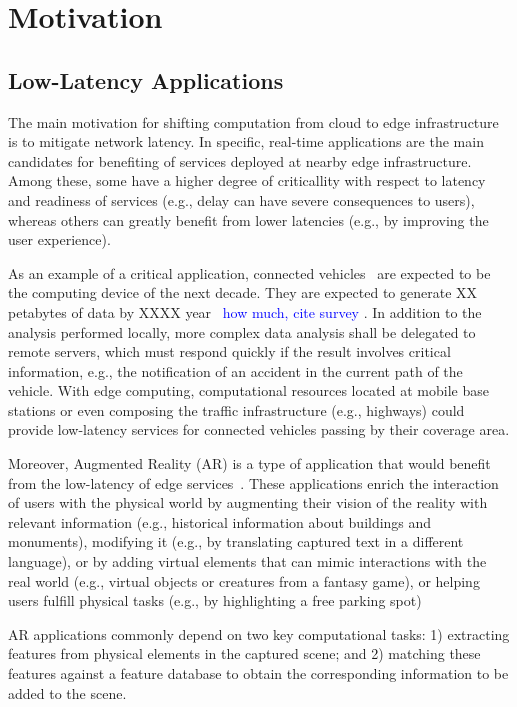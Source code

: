 \section{Motivation}\label{sec:motivation}

\subsection{Low-Latency Applications}

The main motivation for shifting computation from cloud to edge infrastructure is to mitigate network latency. In specific, real-time applications are the main candidates for benefiting of services deployed at nearby edge infrastructure. Among these, some have a higher degree of criticallity with respect to latency and readiness of services (e.g., delay can have severe consequences to users), whereas others can greatly benefit from lower latencies (e.g., by improving the user experience).

As an example of a critical application, connected vehicles~\cite{} are expected to be the computing device of the next decade. They are expected to generate XX petabytes of data by XXXX year~\cite{connectedCars} \textcolor{blue}{how much, cite survey}
. In addition to the analysis performed locally, more complex data analysis shall be delegated to remote servers, which must respond quickly if the result involves critical information, e.g., the notification of an accident in the current path of the vehicle. With edge computing, computational resources located at mobile base stations or even composing the traffic infrastructure (e.g., highways) could provide low-latency services for connected vehicles passing by their coverage area.

Moreover, Augmented Reality (AR) is a type of application that would benefit from the low-latency of edge services~\cite{hu2015mobile,GarrigaMendonca2017}. These applications enrich the interaction of users with the physical
world by augmenting their vision of the reality with relevant information (e.g., historical information about buildings and monuments), modifying it (e.g., by translating captured text in a different language), or by adding virtual elements that can mimic interactions with the real world (e.g., virtual objects or creatures
from a fantasy game), or helping users fulfill physical tasks (e.g., by highlighting a free parking spot) 

AR applications commonly depend on two key computational tasks: 1) extracting features from physical elements in the captured scene; and 2) matching these features against a feature database to obtain the corresponding information to be added to the scene. 

